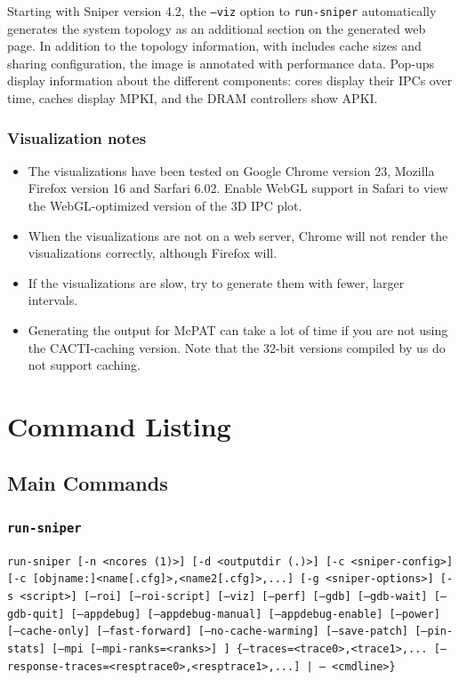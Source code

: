 \documentclass[a4paper,11pt,titlepage]{article}
\newcommand{\cmd}[1]{{\tt #1}}
\begin{document}
Starting with Sniper version 4.2, the \cmd{--viz} option to \cmd{run-sniper} automatically generates the system topology as an additional section on the generated
web page. In addition to the topology information, with includes cache sizes and sharing configuration, the image is annotated with performance data.
Pop-ups display information about the different components: cores display their IPCs over time, caches display MPKI, and the DRAM controllers show APKI.

\subsubsection{Visualization notes}

\begin{itemize}
 \item The visualizations have been tested on Google Chrome version 23, Mozilla Firefox version 16 and Sarfari 6.02. Enable WebGL support in Safari to view the WebGL-optimized version of the 3D IPC plot.
 \item When the visualizations are not on a web server, Chrome will not render the visualizations correctly, although Firefox will.
 \item If the visualizations are slow, try to generate them with fewer, larger intervals.
 \item Generating the output for McPAT can take a lot of time if you are not using the CACTI-caching version. Note that the 32-bit versions compiled by us do not support caching.
\end{itemize}



\section{Command Listing}

\subsection{Main Commands}

\subsubsection{\cmd{run-sniper}}
\label{sec:cmd-run-sniper}

\cmd{run-sniper  [-n <ncores (1)>]  [-d <outputdir (.)>]  [-c <sniper-config>]  [-c [objname:]<name[.cfg]>,<name2[.cfg]>,...]  [-g <sniper-options>]  [-s <script>]  [--roi]  [--roi-script]  [--viz]  [--perf]  [--gdb]  [--gdb-wait]  [--gdb-quit]  [--appdebug]  [--appdebug-manual]  [--appdebug-enable]  [--power]  [--cache-only]  [--fast-forward]  [--no-cache-warming]  [--save-patch]  [--pin-stats]  [--mpi [--mpi-ranks=<ranks>] ]  \{--traces=<trace0>,<trace1>,... [--response-traces=<resptrace0>,<resptrace1>,...] | -- <cmdline>\}}
\end{document}
